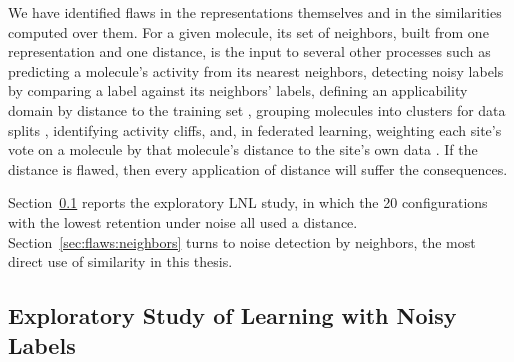 We have identified flaws in the representations themselves and in the similarities computed over them. For a given molecule, its set of neighbors, built from one representation and one distance, is the input to several other processes such as predicting a molecule's activity from its nearest neighbors, detecting noisy labels by comparing a label against its neighbors' labels, defining an applicability domain by distance to the training set \citep{Tropsha2010}, grouping molecules into clusters for data splits \citep{Butina1999}, identifying activity cliffs, and, in federated learning, weighting each site's vote on a molecule by that molecule's distance to the site's own data \citep{Hanser2025}. If the distance is flawed, then every application of distance will suffer the consequences.

Section~\ref{sec:lnl_motivation} reports the exploratory LNL study, in which the 20 configurations with the lowest retention under noise all used a distance. Section~\ref{sec:flaws:neighbors} turns to noise detection by neighbors, the most direct use of similarity in this thesis. 

\subsection{Exploratory Study of Learning with Noisy Labels}\label{sec:lnl_motivation}

